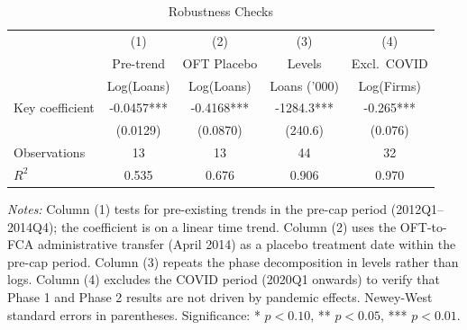 \begin{table}[t]
\centering
\begin{threeparttable}
\caption{Robustness Checks}
\label{tab:robustness}
\begin{tabular}{lcccc}
\toprule
 & (1) & (2) & (3) & (4) \\
 & Pre-trend & OFT Placebo & Levels & Excl.~COVID \\
 & Log(Loans) & Log(Loans) & Loans ('000) & Log(Firms) \\
\midrule
Key coefficient & -0.0457*** & -0.4168*** & -1284.3*** & -0.265*** \\
 & (0.0129) & (0.0870) & (240.6) & (0.076) \\
Observations & 13 & 13 & 44 & 32 \\
$R^2$ & 0.535 & 0.676 & 0.906 & 0.970 \\
\bottomrule
\end{tabular}
\begin{tablenotes}
\item \textit{Notes:} Column (1) tests for pre-existing trends in the pre-cap period (2012Q1--2014Q4); the coefficient is on a linear time trend. Column (2) uses the OFT-to-FCA administrative transfer (April 2014) as a placebo treatment date within the pre-cap period. Column (3) repeats the phase decomposition in levels rather than logs. Column (4) excludes the COVID period (2020Q1 onwards) to verify that Phase 1 and Phase 2 results are not driven by pandemic effects. Newey-West standard errors in parentheses. Significance: * $p < 0.10$, ** $p < 0.05$, *** $p < 0.01$.
\end{tablenotes}
\end{threeparttable}
\end{table}
